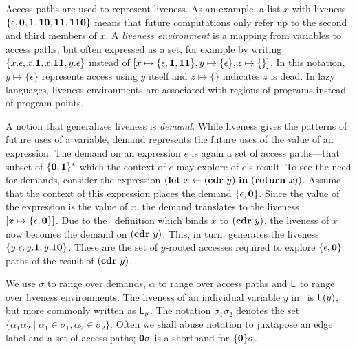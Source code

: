 \documentclass[9pt]{sigplanconf}
\begin{document}
Access paths are used to  represent liveness. As an example, a list
$x$ with 
liveness  $\{\epsilon,  \mathbf{0},  \mathbf{1},  \mathbf{1}\mathbf{0},
\mathbf{1}\mathbf{1},  \mathbf{1}\mathbf{1}\mathbf{0}\}$ means that future computations    only
refer up  to the  second and  third members of  $x$.  A  {\em liveness
  environment} is a mapping from  variables to access paths, but often
expressed as  a set,  for example  by writing  $\{x.\epsilon, x.\mathbf{1},
x.\mathbf{1}\mathbf{1},        y.\epsilon\}$        instead        of        $[x
  \mapsto\{\epsilon,\mathbf{1},\mathbf{1}\mathbf{1}\},          y\mapsto\{\epsilon\},
  z\mapsto\{\}]$.    In  this   notation,  $y   \mapsto  \{\epsilon\}$
represents access using $y$ itself and $z \mapsto \{\}$ indicates 
$z$ is dead.  In lazy  languages, liveness environments are associated
with regions of programs instead of program points.

A notion  that generalizes liveness  is {\em demand}.   While liveness
gives the patterns of future uses of a variable, demand represents the
future uses of the value of an expression.  The demand on an expression
$e$   is   again   a   set    of   access   paths---that   subset   of
$\{\mathbf{0},\mathbf{1}\}^\ast$ which the  context of $e$ may  explore of $e$'s
result.   To see  the need  for demands,  consider the expression
$(\mbox{$\mathbf{ let}$}~x\leftarrow  (\mbox{$\mathbf{cdr}$}~y)~\mbox{$\mathbf{ in}$}~   (\mbox{$\mathbf{ return}$}~x))$.   Assume   that  the
context of this expression places  the demand $\lbrace \epsilon, \mathbf{0}
\rbrace$. Since the  value of the expression is the  value of $x$, the
demand translates to the liveness  $[x \mapsto \lbrace \epsilon, \mathbf{0}
  \rbrace]$.   Due  to  the  \LET\   definition  which  binds  $x$  to
$(\mbox{$\mathbf{cdr}$}~y)$, the liveness of $x$  now becomes the demand on $(\mbox{$\mathbf{cdr}$}~y)$.
This, in  turn, generates  the liveness $\lbrace  y.\epsilon, y.\mathbf{1},
y.\mathbf{1}\mathbf{0}  \rbrace$.   These are  the  set  of $y$-rooted  accesses
required to  explore $\lbrace  \epsilon, \mathbf{0}  \rbrace$ paths  of the
result of $(\mbox{$\mathbf{cdr}$}~y)$.
  
We use $\sigma$  to range over demands, $\alpha$ to  range over access
paths and $\mathsf{L}$  to range over liveness environments.  The liveness of
an  individual variable  $y$ in  \Lv\  is $\mathsf{L}(y)$,  but more  commonly
written as  $\mathsf{L}_y$.  The notation $\sigma_1\sigma_2$  denotes the set
$\lbrace  \alpha_1\alpha_2 \mid  \alpha_1 \in  \sigma_1, \alpha_2  \in
\sigma_2\rbrace$.  Often we shall abuse  notation to juxtapose an edge
label and  a set  of access  paths; $\mathbf{0}\sigma$  is a  shorthand for
$\lbrace\mathbf{0}\rbrace\sigma$.
\end{document}
